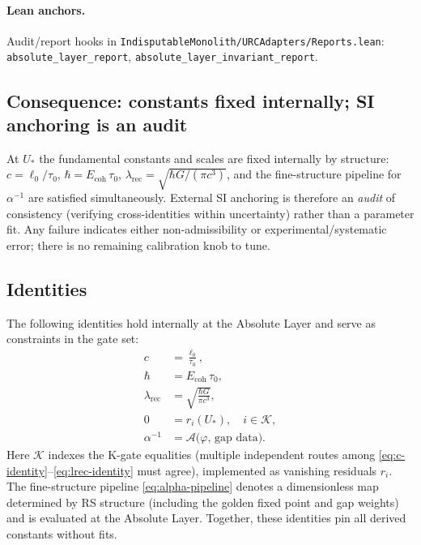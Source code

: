 \documentclass[11pt]{article}
\begin{document}

\paragraph{Lean anchors.} Audit/report hooks in \texttt{IndisputableMonolith/URCAdapters/Reports.lean}: \texttt{absolute\_layer\_report}, \texttt{absolute\_layer\_invariant\_report}.

\subsection{Consequence: constants fixed internally; SI anchoring is an audit}
At \(U_*\) the fundamental constants and scales are fixed internally by structure: \(c=\ell_0/\tau_0\), \(\hbar=E_{\mathrm{coh}}\,\tau_0\), \(\lambda_{\mathrm{rec}}=\sqrt{\hbar G/(\pi c^3)}\), and the fine\mbox{-}structure pipeline for \(\alpha^{-1}\) are satisfied simultaneously. External SI anchoring is therefore an \emph{audit} of consistency (verifying cross\mbox{-}identities within uncertainty) rather than a parameter fit. Any failure indicates either non\mbox{-}admissibility or experimental/systematic error; there is no remaining calibration knob to tune.


\subsection{Identities}
The following identities hold internally at the Absolute Layer and serve as constraints in the gate set:
\begin{align}
  c &= \frac{\ell_0}{\tau_0}, \label{eq:c-identity} \\
  \hbar &= E_{\mathrm{coh}}\,\tau_0, \label{eq:hbar-identity} \\
  \lambda_{\mathrm{rec}} &= \sqrt{\frac{\hbar G}{\pi c^3}}, \label{eq:lrec-identity} \\
  0 &= r_i(U_*), \quad i\in\mathcal{K}, \label{eq:kgates-zero} \\
  \alpha^{-1} &= \mathcal{A}\bigl(\varphi,\,\text{gap data}\bigr). \label{eq:alpha-pipeline}
\end{align}
Here \(\mathcal{K}\) indexes the K\mbox{-}gate equalities (multiple independent routes among \eqref{eq:c-identity}--\eqref{eq:lrec-identity} must agree), implemented as vanishing residuals \(r_i\). The fine\mbox{-}structure pipeline \eqref{eq:alpha-pipeline} denotes a dimensionless map determined by RS structure (including the golden fixed point and gap weights) and is evaluated at the Absolute Layer. Together, these identities pin all derived constants without fits.
\end{document}
